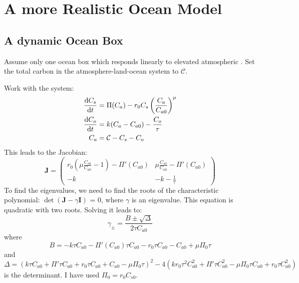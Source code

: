 \section{A more Realistic Ocean Model}
\subsection{A dynamic Ocean Box}
Assume only one ocean box which responds linearly to elevated atmospheric . Set the
total carbon in the atmosphere-land-ocean system to $\mathcal{C}$.

Work with the system:
\begin{subequations}
  \label{eq:one_box_ocean}
  \begin{align}
    \dv{C_s}{t} &= \Pi(C_a) - r_0 C_s \left(\frac{C_a}{C_{a0}}\right)^{\mu} \\
    \dv{C_o}{t} &= k(C_a - C_{a0}) - \frac{C_o}{\tau} \\
    C_a &= \mathcal{C} - C_s - C_o
\end{align}
\end{subequations}
This leads to the Jacobian:
\begin{equation}
  \label{eq:jacobian_of_one_box}
    \bm{J} = 
    \begin{pmatrix}
    r_0 \left( \mu \frac{C_{s0}}{C_{a0}} - 1\right) - \Pi'(C_{a0}) & 
    \mu \frac{C_{s0}}{C_{a0}} - \Pi'(C_{a0}) \\
    -k & -k - \frac{1}{\tau}
    \end{pmatrix}
\end{equation}
To find the eigenvalues, we need to find the roots of the characteristic polynomial:
$\det(\bm{J} - \gamma \bm{I})$ = 0, where $\gamma$ is an eigenvalue. This equation is quadratic with 
two roots. Solving it leads to:
\begin{equation}
  \label{eq:eigenvalues_of_one_box_jac}
  \gamma_{\pm} = \frac{B \pm \sqrt{\Delta}}{2\tau C_{a0}}
\end{equation}
where
\begin{equation}
  \label{eq:B_in_one_box}
  B = -k \tau  C_{a0}-\Pi'(C_{a0}) \tau  C_{a0}-r_0 \tau  C_{a0}-C_{a0}+\mu  \Pi_0 \tau
\end{equation}
and
\begin{equation}
  \label{eq:discriminant_from_one_box}
  \Delta = \left(k \tau  C_{a0} +\Pi'\tau  C_{a0}+r_0 \tau  C_{a0}+C_{a0}-\mu  \Pi_0 \tau \right)^2-4 \left(k r_0 \tau ^2 C_{a0}^2+\Pi' \tau  C_{a0}^2-\mu  \Pi_0 \tau  C_{a0} +r_0 \tau  C_{a0}^2\right)
\end{equation}
is the determinant. I have used $\Pi_0 = r_0 C_{s0}$.

